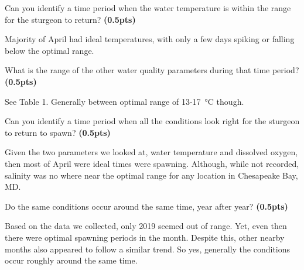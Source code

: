 \documentclass[12pt,letterpaper]{article}
\begin{document}
\begin{enumerate}[font=\bfseries, wide, resume]
    {\color{under}\item Can you identify a time period when the water temperature is within the range for the sturgeon to return? \textbf{(0.5pts)}}

    Majority of April had ideal temperatures, with only a few days spiking or falling below the optimal range. 

    {\color{under}\item What is the range of the other water quality parameters during that time period? \textbf{(0.5pts)}}

    See Table 1. Generally between optimal range of 13-\SI{17}{\celsius} though. 

    {\color{under}\item Can you identify a time period when all the conditions look right for the sturgeon to return to spawn? \textbf{(0.5pts)}}

    Given the two parameters we looked at, water temperature and dissolved oxygen, then most of April were ideal times were spawning. Although, while not recorded, salinity was no where near the optimal range for any location in Chesapeake Bay, MD. 

    \newpage 

    {\color{under}\item Do the same conditions occur around the same time, year after year? \textbf{(0.5pts)}}

    Based on the data we collected, only 2019 seemed out of range. Yet, even then there were optimal spawning periods in the month. Despite this, other nearby months also appeared to follow a similar trend. So yes, generally the conditions occur roughly around the same time. 
\end{enumerate}
\end{document}
